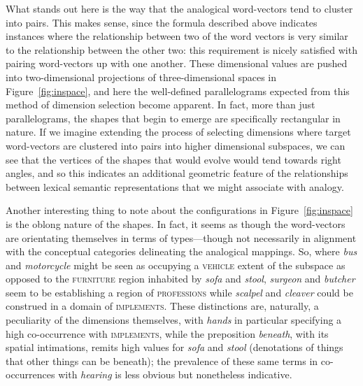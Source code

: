 What stands out here is the way that the analogical word-vectors tend to cluster into pairs.  This makes sense, since the formula described above indicates instances where the relationship between two of the word vectors is very similar to the relationship between the other two: this requirement is nicely satisfied with pairing word-vectors up with one another.  These dimensional values are pushed into two-dimensional projections of three-dimensional spaces in Figure~\ref{fig:inspace}, and here the well-defined parallelograms expected from this method of dimension selection become apparent.  In fact, more than just parallelograms, the shapes that begin to emerge are specifically rectangular in nature.  If we imagine extending the process of selecting dimensions where target word-vectors are clustered into pairs into higher dimensional subspaces, we can see that the vertices of the shapes that would evolve would tend towards right angles, and so this indicates an additional geometric feature of the relationships between lexical semantic representations that we might associate with analogy.

Another interesting thing to note about the configurations in Figure~\ref{fig:inspace} is the oblong nature of the shapes.  In fact, it seems as though the word-vectors are orientating themselves in terms of types---though not necessarily in alignment with the conceptual categories delineating the analogical mappings.  So, where \emph{bus} and \emph{motorcycle} might be seen as occupying a \textsc{vehicle} extent of the subspace as opposed to the \textsc{furniture} region inhabited by \emph{sofa} and \emph{stool}, \emph{surgeon} and \emph{butcher} seem to be establishing a region of \textsc{professions} while \emph{scalpel} and \emph{cleaver} could be construed in a domain of \textsc{implements}.  These distinctions are, naturally, a peculiarity of the dimensions themselves, with \emph{hands} in particular specifying a high co-occurrence with \textsc{implements}, while the preposition \emph{beneath}, with its spatial intimations, remits high values for \emph{sofa} and \emph{stool} (denotations of things that other things can be beneath); the prevalence of these same terms in co-occurrences with \emph{hearing} is less obvious but nonetheless indicative.

